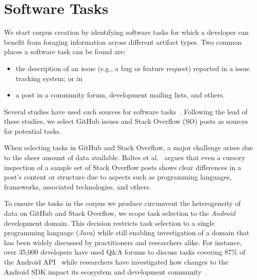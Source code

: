 \section{Software Tasks}
\label{cp4:corpus-tasks}


We start corpus creation by identifying software tasks for which a 
developer can benefit
from
foraging information across different artifact types. 
Two common places a software task can be found are:





\begin{itemize}
    \item the description of an issue
    (e.g., a bug or feature request) reported in a issue tracking system; or in
    \item a post in a community forum, development mailing lists, and others.
\end{itemize}

Several studies have used such  sources for software tasks~\cite{Arya2019, baltes2019, nadi2020, Xu2017}. Following the lead
of these studies, we select
GitHub issues and Stack Overflow (SO) posts as sources for potential tasks.

When selecting tasks in GitHub and Stack Overflow, a major challenge arises due to the sheer amount of data available.
Baltes et al.~\cite{baltes2019} argues that even a cursory inspection of a sample set
of Stack Overflow posts shows clear differences in a post's content or structure due to aspects such as programming languages, frameworks, associated technologies, and others.

To ensure the tasks in the corpus we produce
circumvent the heterogeneity of data on GitHub and Stack Overflow, we scope task selection to the \textit{Android} development domain. This decision
restricts task selection to a single programming language (\textit{Java})
while still enabling investigation of a domain that has been
widely discussed by practitioners and researchers alike.
For instance, over 35,000 developers have used Q\&A forums to discuss tasks covering 87\% of the Android API~\cite{parnin2012}
while researchers have investigated how changes to the Android SDK impact its ecosystem and development community~\cite{linares2014, bavota2014b, mcdonnell2013}.



